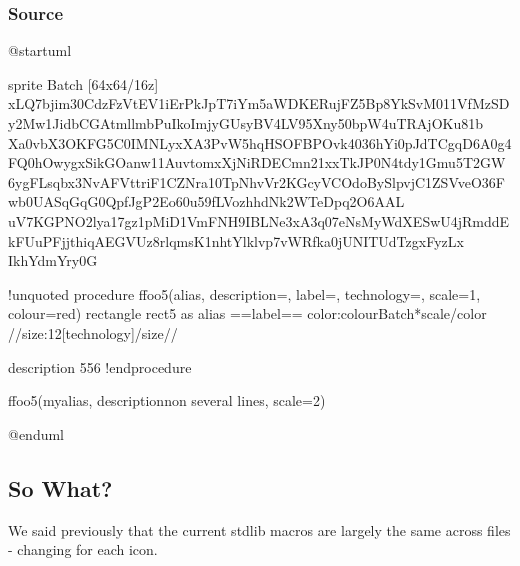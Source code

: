 \documentclass[letterpaper,10pt,english]{sphinxmanual}
\begin{document}
\subsubsection{Source}
\label{\detokenize{PassSpriteAsParameter/PassSpriteAsParameter:id4}}
%
\begin{sphinxVerbatim}[commandchars=\\\{\},numbers=left,firstnumber=1,stepnumber=1]

@startuml

sprite \PYGZdl{}Batch [64x64/16z] \PYGZob{}
xLQ7bjim30CdzFzVtEV1iErPkJpT7iYm5aWDKERujFZ5Bp8YkSvM011VfMzSDy2Mw1JidbCGAtmllmbPuIkoImjyGUsyBV4LV95\PYGZus{}Xny50bpW4uTRAjOKu81b
Xa0vbX3OKFG5C0IMNLyxXA\PYGZus{}3PvW5hqHSOFBP\PYGZus{}Ovk4036hYi0pJdTCgqD6A0g4FQ0hOwygxSikGOanw11AuvtomxXjNiRDECmn21xxTkJP0N4tdy1Gmu5T2GW
6ygFL\PYGZus{}sqbx3NvA\PYGZus{}FVtt\PYGZus{}ri\PYGZus{}F1CZNra\PYGZhy{}10TpNhvVr2KGcyVCOdoBySlpv\PYGZhy{}jC1ZSVveO36\PYGZus{}Fwb0UASqGqG0QpfJgP2Eo60u59\PYGZhy{}fLVozhhdNk2WTeDpq2O6AAL\PYGZus{}
uV7KGPNO2lya17gz1pMiD1VmFNH9IBLNe3xA3q07eNsMy\PYGZus{}WdXESwU4jRmddEk\PYGZhy{}FUuPFjjthiqAEGVUz8rlqmsK1nhtYlklvp7vWRfka0jUNITUdTzgxFyzLx
\PYGZhy{}Ikh\PYGZus{}YdmYr\PYGZus{}y0G
\PYGZcb{}

!unquoted procedure \PYGZdl{}ffoo5(\PYGZdl{}alias, \PYGZdl{}description=\PYGZdq{}\PYGZdq{}, \PYGZdl{}label=\PYGZdq{}\PYGZdq{}, \PYGZdl{}technology=\PYGZdq{}\PYGZdq{}, \PYGZdl{}scale=1, \PYGZdl{}colour=\PYGZdq{}red\PYGZdq{})
rectangle rect5 as \PYGZdq{}
\PYGZlt{}\PYGZlt{}\PYGZdl{}alias\PYGZgt{}\PYGZgt{}
==\PYGZdl{}label==
\PYGZlt{}color:\PYGZdl{}colour\PYGZgt{}\PYGZlt{}\PYGZdl{}Batch*\PYGZdl{}scale\PYGZgt{}\PYGZlt{}/color\PYGZgt{}
//\PYGZlt{}size:12\PYGZgt{}[\PYGZdl{}technology]\PYGZlt{}/size\PYGZgt{}//

  \PYGZdl{}description 556\PYGZdq{}
!endprocedure

\PYGZdl{}ffoo5(myalias, \PYGZdq{}description\PYGZbs{}non several lines\PYGZdq{}, \PYGZdl{}scale=2)

@enduml

\end{sphinxVerbatim}
\sphinxresetverbatimhllines


\subsection{So What?}
\label{\detokenize{PassSpriteAsParameter/PassSpriteAsParameter:so-what}}
We said previously that the current stdlib macros are largely the same across files - changing for each icon.
\end{document}
